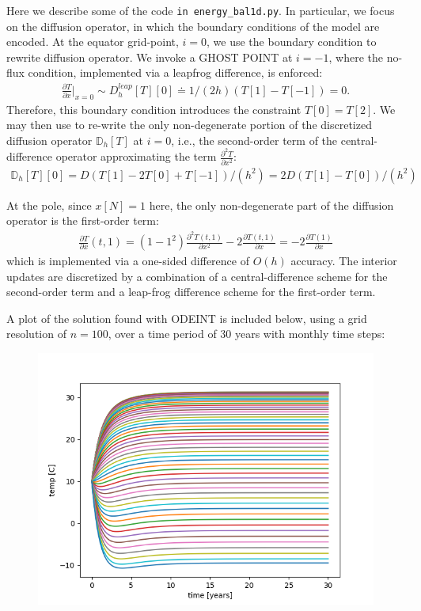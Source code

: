 \documentclass{article}
\theoremstyle{remark}
\newcommand{\D}{ \partial }
\begin{document}
Here we describe some of the code \verb+in energy_bal1d.py+. In particular,
we focus on the diffusion operator, in which the boundary conditions of the
model are encoded. At the equator grid-point, $i=0$, we use the boundary 
condition to rewrite diffusion operator. We invoke a GHOST POINT at $i=-1$, 
where the no-flux condition, implemented via a leapfrog difference, is enforced:
\begin{align}
	\frac{\D T}{\D x}\Big|_{x=0} \sim D_h^{leap}[T][0] 
	\doteq 1/(2h)(T[1]-T[-1]) = 0.
\end{align}
Therefore, this boundary condition introduces the constraint 
$T[0] = T[2]$. We may then use to re-write the only non-degenerate
portion of the discretized diffusion operator $\mathbb{D}_h[T]$ at $i=0$, i.e., 
the second-order term of the central-difference operator approximating
the term $\frac{\D^2 T}{\D x^2}$:
\begin{align}
	\mathbb{D}_h[T][0] = D(T[1] - 2T[0] + T[-1])/(h^2)	
				= 2D(T[1] - T[0])/(h^2)
\end{align}

At the pole, since $x[N] = 1$ here, the only non-degenerate part of the diffusion operator
is the first-order term:
\begin{align}
	\frac{\D T}{\D x}(t,1) = (1-1^2)\frac{\D^2 T(t,1)}{\D x^2} - 2 \frac{\D T(t,1)}{\D x}
			= -2 \frac{\D T(1)}{\D x}
\end{align}
which is implemented via a one-sided difference of $O(h)$ accuracy. The interior updates 
are discretized by a combination of a central-difference scheme for the second-order term
and a leap-frog difference scheme for the first-order term.

A plot of the solution found with ODEINT is included below, using a grid resolution of 
$n = 100$, over a time period of 30 years with monthly time steps:

\begin{figure}
\centering
\includegraphics{odeint_profile.png}
\end{figure}
\end{document}
